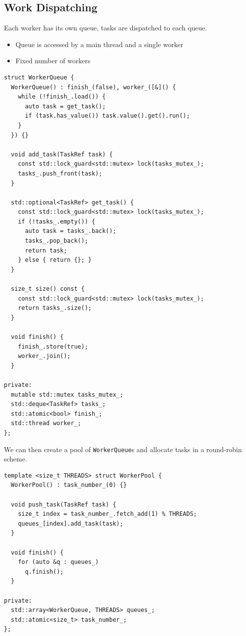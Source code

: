 \subsection{Work Dispatching}
Each worker has its own queue, tasks are dispatched to each queue.
\begin{itemize}
    \item Queue is accessed by a main thread and a single worker
    \item Fixed number of workers
\end{itemize}
\begin{verbatim}
struct WorkerQueue {
  WorkerQueue() : finish_(false), worker_([&]() {
    while (!finish_.load()) {
      auto task = get_task();
      if (task.has_value()) task.value().get().run();
    }
  }) {}

  void add_task(TaskRef task) {
    const std::lock_guard<std::mutex> lock(tasks_mutex_);
    tasks_.push_front(task);
  }

  std::optional<TaskRef> get_task() {
    const std::lock_guard<std::mutex> lock(tasks_mutex_);
    if (!tasks_.empty()) {
      auto task = tasks_.back();
      tasks_.pop_back();
      return task;
    } else { return {}; }
  }

  size_t size() const {
    const std::lock_guard<std::mutex> lock(tasks_mutex_);
    return tasks_.size();
  }

  void finish() {
    finish_.store(true);
    worker_.join();
  }

private:
  mutable std::mutex tasks_mutex_;
  std::deque<TaskRef> tasks_;
  std::atomic<bool> finish_;
  std::thread worker_;
};
\end{verbatim}
We can then create a pool of \texttt{WorkerQueue}s and allocate tasks in a round-robin scheme.
\begin{verbatim}
template <size_t THREADS> struct WorkerPool {
  WorkerPool() : task_number_(0) {}

  void push_task(TaskRef task) {
    size_t index = task_number_.fetch_add(1) % THREADS;
    queues_[index].add_task(task);
  }

  void finish() {
    for (auto &q : queues_)
      q.finish();
  }

private:
  std::array<WorkerQueue, THREADS> queues_;
  std::atomic<size_t> task_number_;
};
\end{verbatim}


